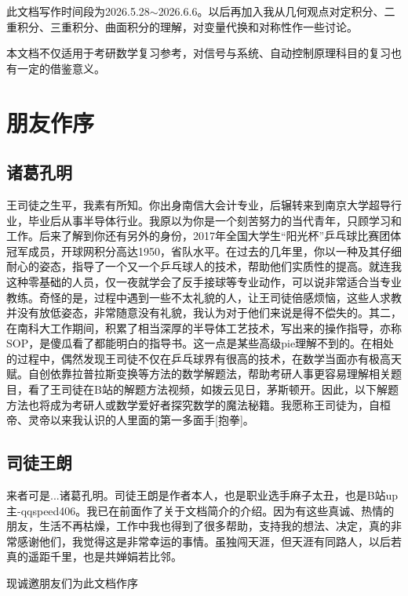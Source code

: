 \documentclass[12pt]{report}
\begin{document}
此文档写作时间段为2026.5.28$\sim$2026.6.6。以后再加入我从几何观点对定积分、二重积分、三重积分、曲面积分的理解，对变量代换和对称性作一些讨论。

本文档不仅适用于考研数学复习参考，对信号与系统、自动控制原理科目的复习也有一定的借鉴意义。

 \chapter*{朋友作序}
 \section*{\textbullet \hspace{0.5em}诸葛孔明}
 
 \mfMicroscope 王司徒之生平，我素有所知。你出身南信大会计专业，后辗转来到南京大学超导行业，毕业后从事半导体行业。我原以为你是一个刻苦努力的当代青年，只顾学习和工作。后来了解到你还有另外的身份，2017年全国大学生“阳光杯”乒乓球比赛团体冠军成员，开球网积分高达1950，省队水平。在过去的几年里，你以一种及其仔细耐心的姿态，指导了一个又一个乒乓球人的技术，帮助他们实质性的提高。就连我这种零基础的人员，仅一夜就学会了反手接球等专业动作，可以说非常适合当专业教练。奇怪的是，过程中遇到一些不太礼貌的人，让王司徒倍感烦恼，这些人求教并没有放低姿态，非常随意没有礼貌，我认为对于他们来说是得不偿失的。其二，在南科大工作期间，积累了相当深厚的半导体工艺技术，写出来的操作指导，亦称SOP，是傻瓜看了都能明白的指导书。这一点是某些高级pie理解不到的。在相处的过程中，偶然发现王司徒不仅在乒乓球界有很高的技术，在数学当面亦有极高天赋。自创依靠拉普拉斯变换等方法的数学解题法，帮助考研人事更容易理解相关题目，看了王司徒在B站的解题方法视频，如拨云见日，茅斯顿开。因此，以下解题方法也将成为考研人或数学爱好者探究数学的魔法秘籍。我愿称王司徒为，自桓帝、灵帝以来我认识的人里面的第一多面手[抱拳]。
 
 \section*{\textbullet \hspace{0.5em}司徒王朗}
 
 来者可是...诸葛孔明。司徒王朗是作者本人，也是职业选手麻子太丑，也是B站up主-qqspeed406。我已在前面作了关于文档简介的介绍。因为有这些真诚、热情的朋友，生活不再枯燥，工作中我也得到了很多帮助，支持我的想法、决定，真的非常感谢他们，我觉得这是非常幸运的事情。虽独闯天涯，但天涯有同路人，以后若真的遥距千里，也是共婵娟若比邻。
 
 现诚邀朋友们为此文档作序
 
\end{document}
